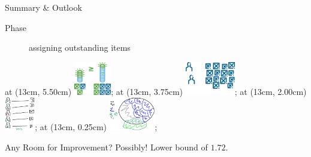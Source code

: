 \begin{frame}{Summary \& Outlook}
\begin{itemize}
\begin{description}
			\item[Phase \phaseiii]
			assigning outstanding items
		\end{description}
	\end{itemize}
	\beamerimage at (13cm, 5.50cm) {\includegraphics[height=1.45cm]{img/diminishingreturns}};
	\beamerimage at (13cm, 3.75cm) {\includegraphics[height=1.45cm]{img/nvsm}};
	\beamerimage at (13cm, 2.00cm) {\includegraphics[height=1.45cm]{img/outstanding_1}};
	\beamerimage at (13cm, 0.25cm) {\includegraphics[height=1.45cm]{img/anal2_1}};
	\begin{minipage}{0.66\textwidth}
		\begin{block}{Any Room for Improvement?}
			Possibly! Lower bound of \(1.72\).
		\end{block}
	\end{minipage}
\end{frame}





\begin{frame}
	\renewcommand{\insertsectionnumber}{!}
	\renewcommand{\insertsection}{End of Talk}
	\sectionpage
\end{frame}